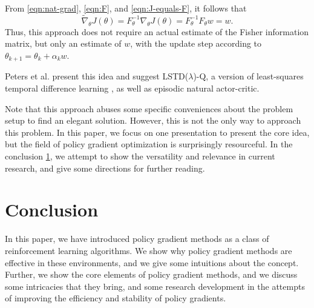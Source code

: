 From \eqref{eqn:nat-grad}, \eqref{eqn:F}, and \eqref{eqn:J-equals-F}, it follows that
\begin{equation}
  \widetilde{\nabla}_\theta J(\theta) = F^{-1}_\theta \nabla_\theta J(\theta) = F_\theta^{-1} F_\theta w = w.
\end{equation}
Thus, this approach does not require an actual estimate of the Fisher information matrix, but only an estimate of $w$, with the update step according to $\theta_{k+1} = \theta_k + \alpha_k w$.

Peters et al. \cite{4863} present this idea and suggest LSTD($\lambda$)-Q, a version of least-squares temporal difference learning  \cite{Boyan:1999:LTD:645528.657618}, as well as episodic natural actor-critic.

Note that this approach abuses some specific conveniences about the problem setup to find an elegant solution. However, this is not the only way to approach this problem. In this paper, we focus on one presentation to present the core idea, but the field of policy gradient optimization is surprisingly resourceful. In the conclusion \ref{sec:outro}, we attempt to show the versatility and relevance in current research, and give some directions for further reading.

\section{Conclusion}
\label{sec:outro}

In this paper, we have introduced policy gradient methods as a class of reinforcement learning algorithms. We show why policy gradient methods are effective in these environments, and we give some intuitions about the concept. Further, we show the core elements of policy gradient methods, and we discuss some intricacies that they bring, and some research development in the attempts of improving the efficiency and stability of policy gradients.


